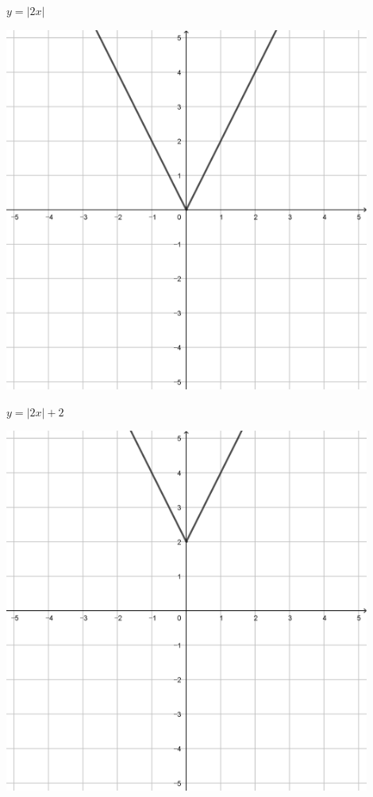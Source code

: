 \documentclass[a4paper]{oblivoir}
\begin{document}
\begin{minipage}{0.45\textwidth}\centering
\(y=|2x|\)
\par\bigskip\includegraphics[width=0.9\textwidth]{img/3_piecewise_17}
\end{minipage}
\begin{minipage}{0.45\textwidth}\centering
\(y=|2x|+2\)
\par\bigskip\includegraphics[width=0.9\textwidth]{img/3_piecewise_18}
\end{minipage}\bigskip\bigskip\par
\end{document}
